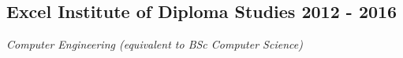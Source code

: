 
\subsection{\texorpdfstring{Excel Institute of Diploma Studies \hfill 2012 - 2016}{}}
\textit{Computer Engineering (equivalent to BSc Computer Science)} \hfill  \\
